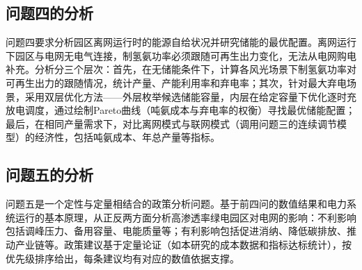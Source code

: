 \subsection{问题四的分析}

问题四要求分析园区离网运行时的能源自给状况并研究储能的最优配置。离网运行下园区与电网无电气连接，制氢氨功率必须跟随可再生出力变化，无法从电网购电补充。分析分三个层次：首先，在无储能条件下，计算各风光场景下制氢氨功率对可再生出力的跟随情况，统计产量、产能利用率和弃电率；其次，针对最大弃电场景，采用双层优化方法——外层枚举候选储能容量，内层在给定容量下优化逐时充放电调度，通过绘制Pareto曲线（吨氨成本与弃电率的权衡）寻找最优储能配置；最后，在相同产量需求下，对比离网模式与联网模式（调用问题三的连续调节模型）的经济性，包括吨氨成本、年总产量等指标。

\subsection{问题五的分析}

问题五是一个定性与定量相结合的政策分析问题。基于前四问的数值结果和电力系统运行的基本原理，从正反两方面分析高渗透率绿电园区对电网的影响：不利影响包括调峰压力、备用容量、电能质量等；有利影响包括促进消纳、降低碳排放、推动产业链等。政策建议基于定量论证（如本研究的成本数据和指标达标统计），按优先级排序给出，每条建议均有对应的数值依据支撑。
